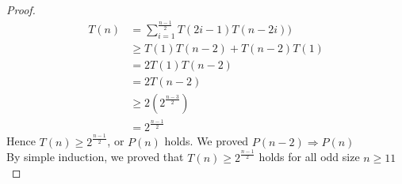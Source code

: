 \documentclass[11pt]{article}
\theoremstyle{plain}%
\theoremstyle{definition}
\theoremstyle{remark}
\begin{document}
\begin{enumerate}
\begin{proof}
    \begin{align*}
      T(n) &= \sum_{i=1}^{\frac{n-1}{2}}{T(2i-1)T(n-2i))}\\
      &\geq T(1)T(n-2) + T(n-2)T(1) \tag{take out first and last term}\\
      &= 2T(1)T(n-2) \\
      &= 2T(n-2) \tag{$T(1)=1$}\\
      &\geq  2 (2^{\frac{n-3}{2}}) \tag{by I.H., $P(n-2)$ holds}\\
      &= 2^{\frac{n-1}{2}}
    \end{align*}
    Hence $T(n)\geq 2^{\frac{n-1}{2}}$, or $P(n)$ holds. We proved $P(n-2)\Rightarrow P(n)$\\
    By simple induction, we proved that $T(n)\geq 2^{\frac{n-1}{2}}$ holds for all odd size $n\geq 11$
  \end{proof}
\end{enumerate}
\end{document}
